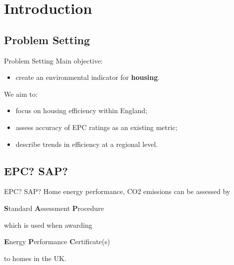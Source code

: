 \section{Introduction}

\subsection{Problem Setting}

\begin{frame}{Problem Setting}
    Main objective:
    
    \begin{itemize}
        \item create an environmental indicator for \textbf{housing}.
    \end{itemize}
    
    \vspace{2.0 em}

    We aim to:

    \begin{itemize}
        \item focus on housing efficiency within England;
        \item assess accuracy of EPC ratings as an existing metric;
        \item describe trends in efficiency at a regional level.
    \end{itemize}
\end{frame}

\subsection{EPC? SAP?}

\begin{frame}{EPC? SAP?}
    Home energy performance, CO2 emissions can be assessed by 

    \begin{center}
        \textbf{S}tandard \textbf{A}ssessment \textbf{P}rocedure
    \end{center}

    which is used when awarding

    \begin{center}
        \textbf{E}nergy \textbf{P}erformance \textbf{C}ertificate(s)
    \end{center}

    to homes in the UK.
\end{frame}

